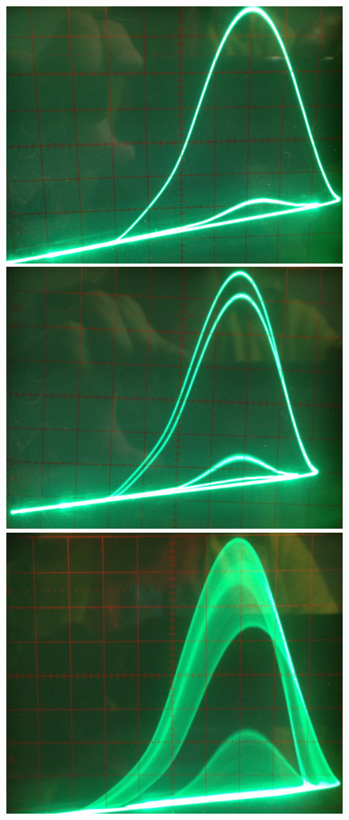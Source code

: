 \documentclass[12pt,a4paper]{article}
\begin{document}
\begin{figure}[!htbp]
\centering
\includegraphics[scale=0.05]{800khz-134V-phase}
\includegraphics[scale=0.055]{800khz-112V-phase}
\includegraphics[scale=0.06]{800khz-29,6V-phase-chaos}

\end{figure}
\end{document}
